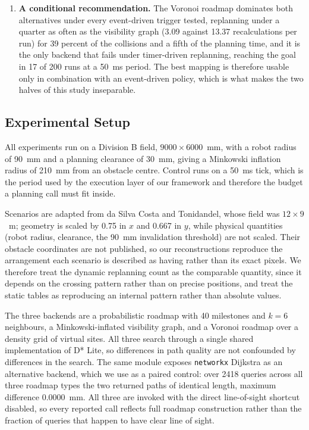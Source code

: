 \begin{enumerate}
\item \textbf{A conditional recommendation.} The Voronoi roadmap dominates both
alternatives under every event-driven trigger tested, replanning under a
quarter as often as the visibility graph (3.09 against 13.37 recalculations per
run) for 39 percent of the collisions and a fifth of the planning time, and it
is the only backend that fails under timer-driven
replanning, reaching the goal in 17 of 200 runs at a 50~ms period. The best
mapping is therefore usable only in combination with an event-driven policy,
which is what makes the two halves of this study inseparable.
\end{enumerate}

\subsection{Experimental Setup}
\label{sec:setup}

All experiments run on a Division B field, $9000 \times 6000$~mm, with a robot
radius of 90~mm and a planning clearance of 30~mm, giving a Minkowski inflation
radius of 210~mm from an obstacle centre. Control runs on a 50~ms tick, which
is the period used by the execution layer of our framework and therefore the
budget a planning call must fit inside.

Scenarios are adapted from da Silva Costa and Tonidandel, whose field was
$12 \times 9$~m; geometry is scaled by 0.75 in $x$ and 0.667 in $y$, while
physical quantities (robot radius, clearance, the 90~mm invalidation
threshold) are not scaled. Their obstacle coordinates are not published, so our
reconstructions reproduce the arrangement each scenario is described as having
rather than its exact pixels. We therefore treat the dynamic replanning count
as the comparable quantity, since it depends on the crossing pattern rather
than on precise positions, and treat the static tables as reproducing an
internal pattern rather than absolute values.

The three backends are a probabilistic roadmap with 40 milestones and $k=6$
neighbours, a Minkowski-inflated visibility graph, and a Voronoi roadmap over a
density grid of virtual sites. All three search through a single shared
implementation of D* Lite, so differences in path quality are not confounded by
differences in the search. The same module exposes \texttt{networkx} Dijkstra
as an alternative backend, which we use as a paired control: over 2418 queries
across all three roadmap types the two returned paths of identical length,
maximum difference $0.0000$~mm. All three are invoked with the
direct line-of-sight shortcut disabled, so every reported call reflects full
roadmap construction rather than the fraction of queries that happen to have
clear line of sight.

